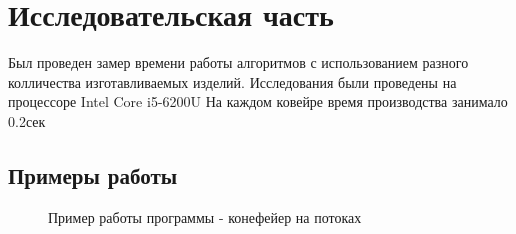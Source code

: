 \documentclass[12pt]{report}
\begin{document}
\chapter{Исследовательская часть}
Был проведен замер времени работы алгоритмов с использованием разного колличества изготавливаемых изделий.
Исследования были проведены на процессоре Intel Core i5-6200U
На каждом ковейре время производства занимало 0.2сек
\section{Примеры работы}
\begin{figure}[H]
	\caption{Пример работы программы - конефейер на потоках}
	\label{ris:example_th}
\end{figure}
\end{document}
